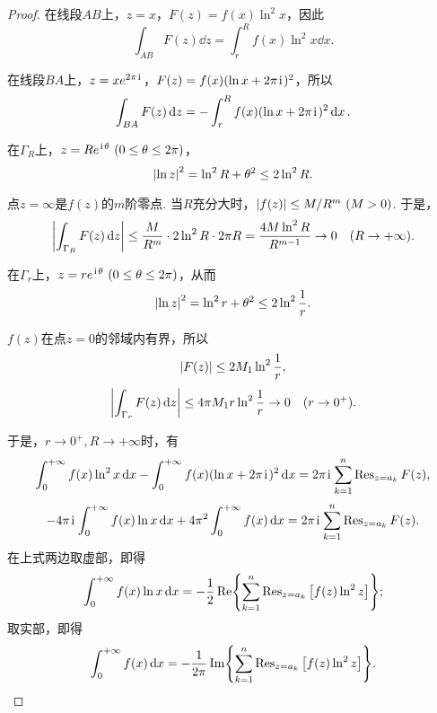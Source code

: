 \begin{theorem}
\begin{proof}
在线段\(AB\)上，\(z=x\)，\(F(z) = f(x) \ln^2 x\)，因此\[
\int_{AB} F(z) \dd{z}
= \int_r^R f(x) \ln^2 x \dd{x}.
\]

在线段\(BA\)上，\(z = x e^{2\pi\kern1pt\mathrm{i}\kern1pt}\)，\(F(z) = f(x) (\ln x + 2\pi\kern1pt\mathrm{i}\kern1pt)^2\)，所以\[
\int_{BA} F(z) \dd{z}
= -\int_r^R f(x) (\ln x + 2\pi\kern1pt\mathrm{i}\kern1pt)^2 \dd{x}.
\]

在\(\Gamma_R\)上，\(z = R e^{\iu\theta}\ (0\leq\theta\leq2\pi)\)，\[
\abs{\ln z}^2 = \ln^2 R + \theta^2 \leq 2 \ln^2 R.
\]

点\(z=\infty\)是\(f(z)\)的\(m\)阶零点.
当\(R\)充分大时，\(\abs{f(z)} \leq M/R^m\ (M>0)\).
于是，\[
\abs{\int_{\Gamma_R} F(z) \dd{z}}
\leq \frac{M}{R^m} \cdot 2 \ln^2 R \cdot 2\pi R
= \frac{4M \ln^2 R}{R^{m-1}} \to 0 \quad(R\to+\infty).
\]

在\(\Gamma_r\)上，\(z = r e^{\iu\theta}\ (0\leq\theta\leq2\pi)\)，从而\[
\abs{\ln z}^2 = \ln^2 r + \theta^2
\leq 2 \ln^2 \frac{1}{r}.
\]

\(f(z)\)在点\(z=0\)的邻域内有界，所以\[
\abs{F(z)} \leq 2M_1 \ln^2 \frac{1}{r},
\]\[
\abs{\int_{\Gamma_r} F(z) \dd{z}}
\leq 4\pi M_1 r \ln^2 \frac{1}{r}
\to 0 \quad(r\to0^+).
\]

于是，\(r\to0^+, R\to+\infty\)时，有\[
\int_0^{+\infty} f(x) \ln^2 x \dd{x}
- \int_0^{+\infty} f(x) (\ln x + 2\pi\kern1pt\mathrm{i}\kern1pt)^2 \dd{x}
= 2\pi\kern1pt\mathrm{i}\kern1pt \sum\limits_{k=1}^n \operatorname{Res}_{z=a_k} F(z),
\]\[
-4\pi\kern1pt\mathrm{i}\kern1pt \int_0^{+\infty} f(x) \ln x \dd{x}
+ 4\pi^2 \int_0^{+\infty} f(x) \dd{x}
= 2\pi\kern1pt\mathrm{i}\kern1pt \sum\limits_{k=1}^n \operatorname{Res}_{z=a_k} F(z).
\]
在上式两边取虚部，即得\begin{equation}\label{equation:留数定理.利用留数定理计算实积分4.2}
\int_0^{+\infty} f(x) \ln x \dd{x}
= -\frac{1}{2} \Re{ \sum\limits_{k=1}^n \operatorname{Res}_{z=a_k} \left[ f(z) \ln^2 z \right] };
\end{equation}
取实部，即得\begin{equation}\label{equation:留数定理.利用留数定理计算实积分4.3}
\int_0^{+\infty} f(x) \dd{x}
= -\frac{1}{2\pi} \Im{ \sum\limits_{k=1}^n \operatorname{Res}_{z=a_k} \left[ f(z) \ln^2 z \right] }.
\end{equation}
\end{proof}
\end{theorem}

